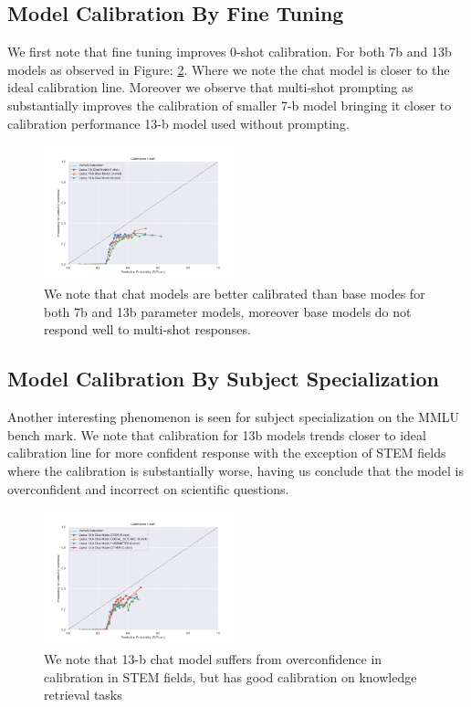 \documentclass[11pt]{article}
\begin{document}
\subsection{Model Calibration By Fine Tuning}  

We first note that fine tuning improves 0-shot calibration. For both 7b and 13b models as observed in 
Figure: \ref{fig:chat-vs-hf}. Where we note the chat model is closer to the ideal calibration line. Moreover we observe that 
multi-shot prompting as substantially improves the calibration of smaller 7-b model bringing it closer to calibration performance 13-b model used without prompting.

\begin{figure}
  \includegraphics[width=0.5\textwidth]{figures/0-shot-13-b-chat-vs-13-b-hf.png}
  \caption{We note that chat models are better calibrated than base modes for both 7b and 13b parameter models, moreover base models do not respond well to multi-shot responses.}
  \label{fig:chat-vs-hf}
\end{figure}

\subsection{Model Calibration By Subject Specialization}  

Another interesting phenomenon is seen for subject specialization on the MMLU bench mark. We note that calibration for 13b models  trends closer to ideal calibration line for more confident response with the exception of STEM fields where the calibration is substantially worse, having us conclude that the model 
is overconfident and incorrect on scientific questions.

\begin{figure}
  \includegraphics[width=0.5\textwidth]{figures/0-shot-13-b-chat-vs-subjects.png}
  \caption{We note that 13-b chat model suffers from overconfidence in calibration in STEM fields, but has good calibration on knowledge retrieval tasks}
  \label{fig:chat-vs-hf}
\end{figure}
\end{document}
